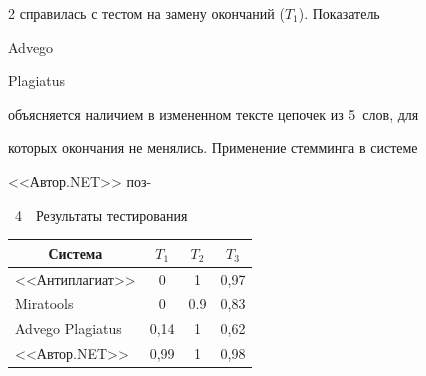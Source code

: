\begin{multicols}{2}
справилась с тестом на замену  окончаний ($T_1$). Показатель {Advego 

Plagiatus} объясняется наличием в измененном тексте цепочек из 5~слов, для 

которых окончания не менялись. Применение стемминга в сис\-те\-ме 

<<Автор.NET>> поз-\linebreak\vspace*{-12pt}



\noindent

\begin{center}  %


{{\tablename~4}\ \ \small{Результаты тестирования}}

\vspace*{2ex}



{\small \begin{tabular}{|l|c|c|c|}

\hline

\multicolumn{1}{|c|}{Система}&$T_1$&$T_2$

&$T_3$\\

\hline

<<Антиплагиат>>&0\hphantom{,99}&1&0,97\\

{Miratools}&0\hphantom{,99}&\hphantom{,9}0.9&0,83\\

{Advego Plagiatus}&0,14&1&0,62\\

<<Автор.NET>>&0,99&1&0,98\\

\hline

\end{tabular}



}


\end{center}





\pagebreak







\end{multicols}
